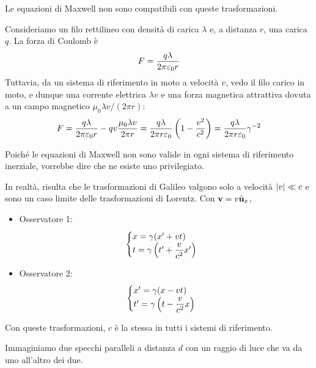 Le equazioni di Maxwell non sono compatibili con queste trasformazioni.

Consideriamo un filo rettilineo con densità di carica $\lambda$ e, a distanza $r$, una carica $q$.
La forza di Coulomb è
\begin{equation}
    F = \frac{q \lambda}{2\pi \varepsilon_0 r}
\end{equation}
Tuttavia, da un sistema di riferimento in moto a velocità $v$, vedo il filo carico in moto, e dunque una corrente elettrica $\lambda v$ e una forza magnetica attrattiva dovuta a un campo magnetico $\mu_0 \lambda v / (2\pi r)$:
\begin{equation}
\label{eq:frel}
    F = \frac{q \lambda}{2\pi \varepsilon_0 r} - q v \frac{\mu_0 \lambda v}{2\pi r}
    = \frac{q \lambda}{2\pi r \varepsilon_0} \left( 1 - \frac{v^2}{c^2} \right)
    = \frac{q \lambda}{2\pi r \varepsilon_0} \gamma^{-2}
\end{equation}

Poiché le equazioni di Maxwell non sono valide in ogni sistema di riferimento inerziale, vorrebbe dire che ne esiste uno privilegiato.

In realtà, risulta che le trasformazioni di Galileo valgono solo a velocità $\left\lvert v \right\rvert \ll c$ e sono un caso limite delle trasformazioni di Lorentz.
Con $\mathbf{v} = v \hat{\mathbf{u}}_{x}$,
\begin{itemize}
    \item Osservatore 1:
    \begin{equation}
        \begin{cases}
            x = \gamma (x' + v t) \\
            t = \gamma \left( t' + \dfrac{v}{c^2} x' \right)
        \end{cases}
    \end{equation}
    \item Osservatore 2:
    \begin{equation}
        \begin{cases}
            x' = \gamma (x - v t) \\
            t' = \gamma \left( t - \dfrac{v}{c^2} x \right)
        \end{cases}
    \end{equation}
\end{itemize}

Con queste trasformazioni, $c$ è la stessa in tutti i sistemi di riferimento.

Immaginiamo due specchi paralleli a distanza $d$ con un raggio di luce che va da uno all'altro dei due.

